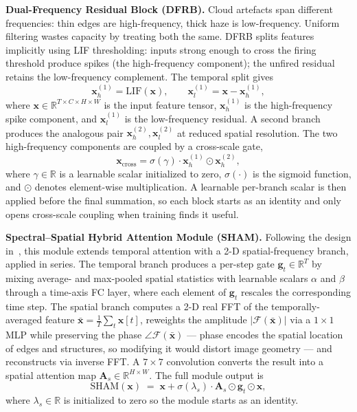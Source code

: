 \documentclass[conference]{IEEEtran}
\newcommand{\DFRB}{\textsc{DFRB}}
\newcommand{\SHAM}{\textsc{SHAM}}
\begin{document}
\noindent\textbf{Dual-Frequency Residual Block (\DFRB{}).}
Cloud artefacts span different frequencies: thin edges are
high-frequency, thick haze is low-frequency. Uniform filtering wastes
capacity by treating both the same. \DFRB{} splits features implicitly
using LIF thresholding: inputs strong enough to cross the firing
threshold produce spikes (the high-frequency component); the unfired
residual retains the low-frequency complement. The temporal split gives
\begin{equation}
    \mathbf{x}_h^{(1)} = \mathrm{LIF}(\mathbf{x}), \qquad
    \mathbf{x}_l^{(1)} = \mathbf{x} - \mathbf{x}_h^{(1)},
    \label{eq:dfrb-split1}
\end{equation}
where $\mathbf{x}\in\mathbb{R}^{T\times C\times H\times W}$ is the
input feature tensor, $\mathbf{x}_h^{(1)}$ is the high-frequency
spike component, and $\mathbf{x}_l^{(1)}$ is the low-frequency
residual. A second branch produces the analogous pair
$\mathbf{x}_h^{(2)},\mathbf{x}_l^{(2)}$ at reduced spatial
resolution. The two high-frequency components are coupled by a
cross-scale gate,
\begin{equation}
    \mathbf{x}_{\mathrm{cross}} =
    \sigma(\gamma)\cdot\mathbf{x}_h^{(1)}\odot\mathbf{x}_h^{(2)},
    \label{eq:dfrb-gate}
\end{equation}
where $\gamma\in\mathbb{R}$ is a learnable scalar initialized to
zero, $\sigma(\cdot)$ is the sigmoid function, and $\odot$ denotes
element-wise multiplication. A learnable per-branch scalar is then
applied before the final summation, so each block starts as an
identity and only opens cross-scale coupling when training finds it
useful.

\noindent\textbf{Spectral--Spatial Hybrid Attention Module (\SHAM{}).}
Following the design in~\cite{ref:fstasnn2025}, this module extends
temporal attention with a 2-D spatial-frequency branch, applied in
series. The temporal branch produces a per-step gate
$\mathbf{g}_t\in\mathbb{R}^T$ by mixing average- and max-pooled spatial
statistics with learnable scalars $\alpha$ and $\beta$ through a
time-axis FC layer, where each element of $\mathbf{g}_t$ rescales the
corresponding time step. The spatial branch computes a 2-D real FFT of
the temporally-averaged feature
$\bar{\mathbf{x}}\!=\!\tfrac{1}{T}\sum_t\mathbf{x}[t]$, reweights the
amplitude $|\mathcal{F}(\bar{\mathbf{x}})|$ via a $1{\times}1$ MLP
while preserving the phase $\angle\mathcal{F}(\bar{\mathbf{x}})$ ---
phase encodes the spatial location of edges and structures, so
modifying it would distort image geometry --- and reconstructs via
inverse FFT. A $7{\times}7$ convolution converts the result into a
spatial attention map $\mathbf{A}_s\in\mathbb{R}^{H\times W}$. The
full module output is
\begin{equation}
    \mathrm{SHAM}(\mathbf{x}) \;=\;
    \mathbf{x} + \sigma(\lambda_s)\cdot
    \mathbf{A}_s \odot \mathbf{g}_t \odot \mathbf{x},
    \label{eq:sham}
\end{equation}
where $\lambda_s\in\mathbb{R}$ is initialized to zero so the
module starts as an identity.
\end{document}

